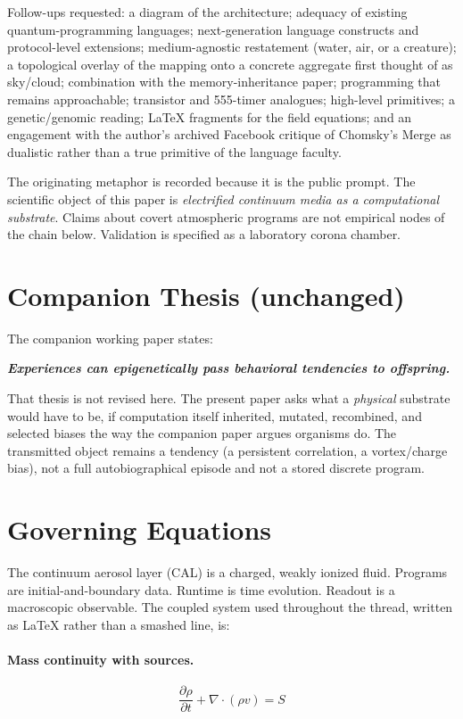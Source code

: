 \documentclass[11pt,a4paper]{article}
\begin{document}
Follow-ups requested: a diagram of the architecture; adequacy of existing quantum-programming languages; next-generation language constructs and protocol-level extensions; medium-agnostic restatement (water, air, or a creature); a topological overlay of the mapping onto a concrete aggregate first thought of as sky/cloud; combination with the memory-inheritance paper; programming that remains approachable; transistor and 555-timer analogues; high-level primitives; a genetic/genomic reading; LaTeX fragments for the field equations; and an engagement with the author's archived Facebook critique of Chomsky's Merge as dualistic rather than a true primitive of the language faculty.

The originating metaphor is recorded because it is the public prompt. The scientific object of this paper is \emph{electrified continuum media as a computational substrate}. Claims about covert atmospheric programs are not empirical nodes of the chain below. Validation is specified as a laboratory corona chamber.

\section{Companion Thesis (unchanged)}
The companion working paper states:
\begin{center}
\large\textit{\textbf{Experiences can epigenetically pass behavioral tendencies to offspring.}}
\end{center}
That thesis is not revised here. The present paper asks what a \emph{physical} substrate would have to be, if computation itself inherited, mutated, recombined, and selected biases the way the companion paper argues organisms do. The transmitted object remains a tendency (a persistent correlation, a vortex/charge bias), not a full autobiographical episode and not a stored discrete program.

\section{Governing Equations}
The continuum aerosol layer (CAL) is a charged, weakly ionized fluid. Programs are initial-and-boundary data. Runtime is time evolution. Readout is a macroscopic observable. The coupled system used throughout the thread, written as LaTeX rather than a smashed line, is:

\paragraph{Mass continuity with sources.}
\begin{equation}
\frac{\partial\rho}{\partial t} + \nabla\cdot(\rho v) = S
\label{eq:continuity}
\end{equation}
\end{document}
